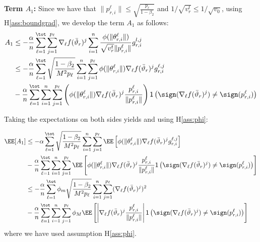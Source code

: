 \documentclass{article}
\begin{document}
\textbf{ Term $A_1$:}
Since we have that $\|p_{r,i}^{\ell}\| \leq \sqrt{\frac{p_\ell}{1-\beta_2}}$ and $1/\sqrt{v^{t}_{r}} \leq 1/\sqrt{v_{0}}$, using H\ref{ass:boundgrad}, we develop the term $A_1$ as follows:
\begin{align}
A_1 & \leq - \frac{\alpha}{n} \sum_{\ell=1}^\tot \sum_{j=1}^{p_\ell} \nabla_{\ell} f(\bar{\vartheta}_r)^j  \sum_{i = 1}^n \frac{\phi(\|\theta_{r,i}^{\ell}\|)}{\sqrt{v^{t}_{r}} \|p_{r,i}^{\ell}\|} g_{r,i}^{l,j}\\
& \leq - \frac{\alpha}{n} \sum_{\ell=1}^\tot  \sqrt{\frac{1-\beta_2}{M^2 p_\ell}} \sum_{i = 1}^n \sum_{j=1}^{p_\ell}   \phi(\|\theta_{r,i}^{\ell}\|)  \nabla_{\ell} f(\bar{\vartheta}_r)^j  g^{\ell, j}_{r,i}\\
& - \frac{\alpha}{n} \sum_{\ell=1}^\tot \sum_{i = 1}^n \sum_{j=1}^{p_\ell}   \left( \phi(\|\theta_{r,i}^{\ell}\|)  \nabla_{\ell} f(\bar{\vartheta}_r)^j  \frac{p_{r,i}^{\ell}}{ \|p_{r,i}^{\ell}\|}\right)\mathsf{1}\left( \sign(  \nabla_{\ell} f(\bar{\vartheta}_r)^j) \neq  \sign( p_{r,i}^{\ell}) \right)
\end{align}

Taking the expectations on both sides yields and using H\ref{ass:phi}:

\begin{align}
\EE[A_1]  & \leq - \alpha \sum_{\ell=1}^\tot  \sqrt{\frac{1-\beta_2}{M^2 p_\ell}} \sum_{i = 1}^n \sum_{j=1}^{p_\ell} \EE \left[  \phi(\|\theta_{r,i}^{\ell}\|)  \nabla_{\ell} f(\bar{\vartheta}_r)^j  g^{\ell, j}_{r,i}\right]\\
& - \frac{\alpha}{n} \sum_{\ell=1}^\tot \sum_{i = 1}^n \sum_{j=1}^{p_\ell}   \EE\left[ \phi(\|\theta_{r,i}^{\ell}\|)  \nabla_{\ell} f(\bar{\vartheta}_r)^j  \frac{p_{r,i}^{\ell}}{ \|p_{r,i}^{\ell}\|}\mathsf{1} \left( \sign(  \nabla_{\ell} f(\bar{\vartheta}_r)^j) \neq  \sign( p_{r,i}^{\ell}) \right) \right]\\
& \leq - \frac{\alpha}{n} \sum_{\ell=1}^\tot  \phi_m \sqrt{\frac{1-\beta_2}{M^2 p_\ell}} \sum_{i = 1}^n \sum_{j=1}^{p_\ell}    (\nabla_{\ell} f(\bar{\vartheta}_r)^j)^2\\
& - \frac{\alpha}{n} \sum_{\ell=1}^\tot \sum_{i = 1}^n \sum_{j=1}^{p_\ell} \phi_M  \EE\left[ \left| \nabla_{\ell} f(\bar{\vartheta}_r)^j  \frac{p_{r,i}^{\ell}}{ \|p_{r,i}^{\ell}\|}\right| \mathsf{1}\left( \sign(  \nabla_{\ell} f(\bar{\vartheta}_r)^j) \neq  \sign( p_{r,i}^{\ell})\right) \right]\\
\end{align}
where we have used assumption H\ref{ass:phi}.
\end{document}
